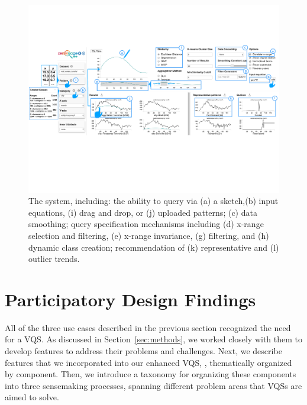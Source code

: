 \begin{figure}[ht!]
\centering
\vspace{-15pt}
\includegraphics[width=\linewidth]{figures/zvpp_system.pdf} %
\vspace{-5pt}\caption{The \zvpp system, including: the ability to query via (a) a sketch,(b) input equations, (i) drag and drop, or (j) uploaded patterns; (c) data smoothing; query specification mechanisms including (d) x-range selection and filtering, (e) x-range invariance, (g) filtering, and (h) dynamic class creation; recommendation of (k) representative and (l) outlier trends.} %
\label{zvOverview}
\vspace{-14pt}
\end{figure}
\section{Participatory Design Findings\label{sec:pd_findings}}
All of the three use cases 
described in the previous section 
recognized the need for a VQS. 
As discussed in Section~\ref{sec:methods},
we worked closely with them to develop 
features to address their problems and challenges. 
Next, we describe features that 
we incorporated into our enhanced VQS, \zvpp, 
thematically organized by component. 
Then, we introduce a taxonomy for 
organizing these components 
into three sensemaking processes, 
spanning different problem areas that VQSs are aimed to solve. 

